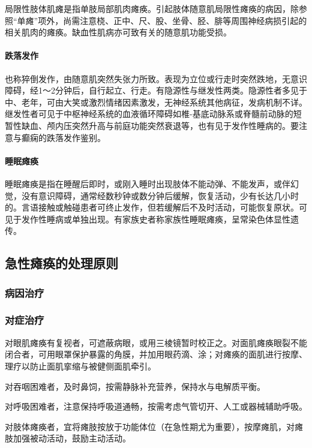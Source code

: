局限性肢体肌瘫是指单肢局部肌肉瘫痪。引起肢体随意肌局限性瘫痪的病因，除参照“单瘫”项外，尚需注意桡、正中、尺、股、坐骨、胫、腓等周围神经病损引起的相关肌肉的瘫痪。缺血性肌病亦可致有关的随意肌功能受损。

\paragraph{跌落发作}

也称猝倒发作，由随意肌突然失张力所致。表现为立位或行走时突然跌地，无意识障碍，经1～2分钟后，自行起立、行走。有隐源性与继发性两类。隐源性者多见于中、老年，可由大笑或激烈情绪因素激发，无神经系统其他病征，发病机制不详。继发性者可见于中枢神经系统的血液循环障碍如椎-基底动脉系或脊髓前动脉的短暂性缺血、颅内压突然升高与前庭功能突然衰退等，也有见于发作性睡病的。要注意与癫痫的跌落发作鉴别。

\paragraph{睡眠瘫痪}

睡眠瘫痪是指在睡醒后即时，或刚入睡时出现肢体不能动弹、不能发声，或伴幻觉，没有意识障碍，通常经数秒钟或数分钟后缓解，恢复活动，少有长达几小时的。言语接触或触碰患者可终止发作，但若缓解后不及时活动，可能恢复原状。可见于发作性睡病或单独出现。有家族史者称家族性睡眠瘫痪，呈常染色体显性遗传。

\subsection{急性瘫痪的处理原则}

\subsubsection{病因治疗}

\subsubsection{对症治疗}

对眼肌瘫痪有复视者，可遮蔽病眼，或用三棱镜暂时校正之。对面肌瘫痪眼裂不能闭合者，可用眼罩保护暴露的角膜，并加用眼药滴、涂；对瘫痪的面肌进行按摩、理疗以防止面肌挛缩与被健侧面肌牵引。

对吞咽困难者，及时鼻饲，按需静脉补充营养，保持水与电解质平衡。

对呼吸困难者，注意保持呼吸道通畅，按需考虑气管切开、人工或器械辅助呼吸。

对肢体瘫痪者，宜将瘫肢按放于功能体位（在急性期尤为重要），按摩瘫肌，对瘫肢加强被动活动，鼓励主动活动。

